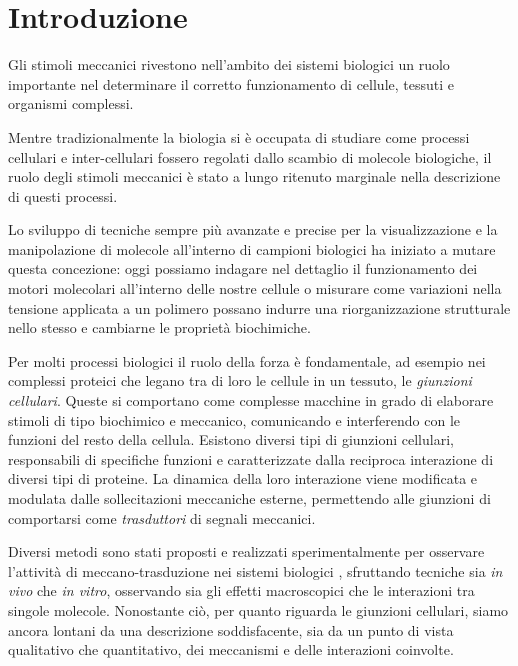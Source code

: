 
\chapter{Introduzione}


Gli stimoli meccanici rivestono nell'ambito dei sistemi biologici un
ruolo importante nel determinare il corretto funzionamento di cellule,
tessuti e organismi complessi.

Mentre tradizionalmente la biologia si è occupata di studiare come
processi cellulari e inter-cellulari fossero regolati dallo scambio
di molecole biologiche, il ruolo degli stimoli meccanici è stato a
lungo ritenuto marginale nella descrizione di questi processi.

Lo sviluppo di tecniche sempre più avanzate e precise per la
visualizzazione e la manipolazione di molecole all'interno di campioni
biologici ha iniziato a mutare questa concezione: oggi possiamo
indagare nel dettaglio il funzionamento dei motori molecolari
all'interno delle nostre cellule o misurare come variazioni nella
tensione applicata a un polimero possano indurre una riorganizzazione
strutturale nello stesso e cambiarne le proprietà biochimiche.

Per molti processi biologici il ruolo della forza è fondamentale,
ad esempio nei complessi proteici che legano tra di loro le cellule
in un tessuto, le \emph{giunzioni cellulari}.
Queste si comportano come complesse macchine in grado di elaborare
stimoli di tipo biochimico e meccanico, comunicando e interferendo
con le funzioni del resto della cellula.
Esistono diversi tipi di giunzioni cellulari, responsabili di
specifiche funzioni e caratterizzate dalla reciproca interazione di
diversi tipi di proteine. La dinamica della loro interazione viene
modificata e modulata dalle sollecitazioni meccaniche esterne,
permettendo alle giunzioni di comportarsi come \emph{trasduttori}
di segnali meccanici.

Diversi metodi sono stati proposti e realizzati sperimentalmente
per osservare l'attività di meccano-trasduzione nei sistemi
biologici \cite{??}, sfruttando tecniche sia \textit{in vivo} che
\textit{in vitro}, osservando sia gli effetti macroscopici che
le interazioni tra singole molecole.
Nonostante ciò, per quanto riguarda le giunzioni cellulari, siamo
ancora lontani da una descrizione soddisfacente, sia da un punto
di vista qualitativo che quantitativo, dei meccanismi e delle
interazioni coinvolte.


